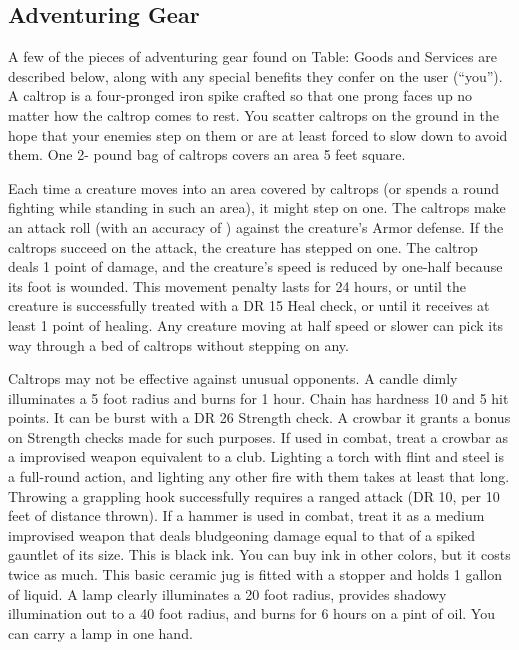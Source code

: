\subsection{Adventuring Gear}
A few of the pieces of adventuring gear found on Table: Goods and Services are described below, along with any special benefits they confer on the user (``you'').
 A caltrop is a four-pronged iron spike crafted so that one prong faces up no matter how the caltrop comes to rest. You scatter caltrops on the ground in the hope that your enemies step on them or are at least forced to slow down to avoid them. One 2- pound bag of caltrops covers an area 5 feet square.
\par Each time a creature moves into an area covered by caltrops (or spends a round fighting while standing in such an area), it might step on one. The caltrops make an attack roll (with an accuracy of ) against the creature's Armor defense. If the caltrops succeed on the attack, the creature has stepped on one. The caltrop deals 1 point of damage, and the creature's speed is reduced by one-half because its foot is wounded. This movement penalty lasts for 24 hours, or until the creature is successfully treated with a DR 15 Heal check, or until it receives at least 1 point of healing. Any creature moving at half speed or slower can pick its way through a bed of caltrops without stepping on any.
\par Caltrops may not be effective against unusual opponents.
 A candle dimly illuminates a 5 foot radius and burns for 1 hour.
 Chain has hardness 10 and 5 hit points. It can be burst with a DR 26 Strength check.
 A crowbar it grants a  bonus on Strength checks made for such purposes. If used in combat, treat a crowbar as a improvised weapon equivalent to a club.
 Lighting a torch with flint and steel is a full-round action, and lighting any other fire with them takes at least that long.
 Throwing a grappling hook successfully requires a ranged attack (DR 10,  per 10 feet of distance thrown).
 If a hammer is used in combat, treat it as a medium improvised weapon that deals bludgeoning damage equal to that of a spiked gauntlet of its size.
 This is black ink. You can buy ink in other colors, but it costs twice as much.
 This basic ceramic jug is fitted with a stopper and holds 1 gallon of liquid.
 A lamp clearly illuminates a 20 foot radius, provides shadowy illumination out to a 40 foot radius, and burns for 6 hours on a pint of oil. You can carry a lamp in one hand.
